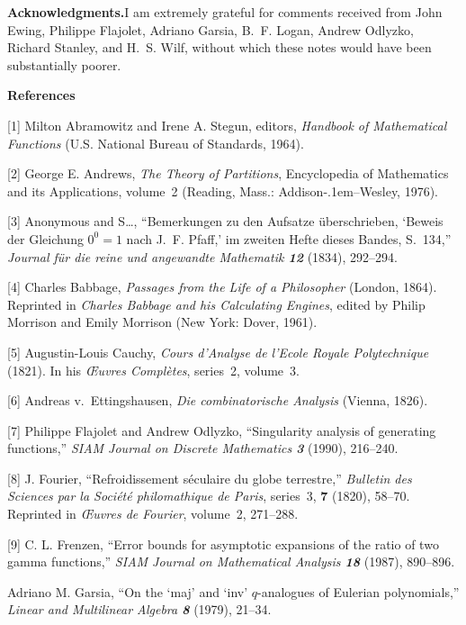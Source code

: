 \bigskip\noindent
{\bf Acknowledgments.}\enspace I am extremely grateful for comments
received from John Ewing, Philippe Flajolet, Adriano Garsia, B.~F.
Logan, Andrew Odlyzko, Richard Stanley, and H.~S. Wilf, without
which these notes would have been substantially poorer.

\bigskip
\centerline{\bf References}

\bib
\phantom{1}[1]\enspace
Milton Abramowitz and Irene A. Stegun, editors, {\sl Handbook of
Mathematical Functions\/} (U.S. National Bureau of Standards, 1964).

\bib
\phantom{1}[2]\enspace
George E. Andrews, {\sl The Theory of Partitions}, Encyclopedia of
Mathematics and its Applications, volume~2 (Reading, Mass.:
Addison\kern-.1em--Wesley, 1976).

\bib
\phantom{1}[3]\enspace 
Anonymous and S{\thinspace}\dots , 
``Bemerkungen zu den Aufsatze \"uberschrieben,
`Beweis der Gleichung $0^0=1$ nach J.~F. Pfaff,' im zweiten Hefte
dieses Bandes, S.~134,''
{\sl Journal f\"ur die reine und angewandte Mathematik\/
\bf 12} (1834), 292--294.

\bib
\phantom{1}[4]\enspace
Charles Babbage, {\sl Passages from the Life of a Philosopher\/}
(London, 1864). Reprinted in {\sl Charles Babbage and his Calculating
Engines}, edited by Philip Morrison and Emily Morrison (New York:
Dover, 1961).

\bib
\phantom{1}[5]\enspace
Augustin-Louis Cauchy, {\sl Cours d'Analyse de l'Ecole Royale
Polytechnique\/} (1821). In his {\sl {\OE}uvres Compl\`etes},
series~2, volume~3.

\bib
\phantom{1}[6]\enspace
Andreas v.\ Ettingshausen, {\sl Die combinatorische Analysis\/}
(Vienna, 1826).

\bib
\phantom{1}[7]
Philippe Flajolet and Andrew Odlyzko, ``Singularity analysis of
generating functions,'' {\sl SIAM Journal on Discrete Mathematics\/
\bf 3} (1990), 216--240.

\bib
\phantom{1}[8]\enspace
J. Fourier, ``Refroidissement s\'eculaire du globe terrestre,'' {\sl
Bulletin des Sciences par la Soci\'et\'e philomathique de Paris},
series~3, {\bf 7} (1820), 58--70. Reprinted in {\sl{\OE}uvres de
Fourier}, volume~2, 271--288.

\bib
\phantom{1}[9]\enspace
C. L. Frenzen, ``Error bounds for asymptotic expansions of the
ratio of two gamma functions,'' {\sl SIAM Journal on Mathematical
Analysis\/ \bf 18} (1987), 890--896.

\bib
[10]\enspace
Adriano M. Garsia, ``On the `maj' and `inv' $q$-analogues of Eulerian
polynomials,'' {\sl Linear and Multilinear Algebra\/ \bf 8} (1979),
21--34. 


